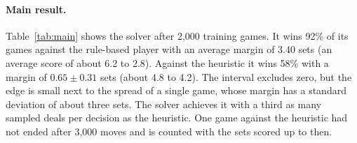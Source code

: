 \documentclass{article}
\begin{document}
\paragraph{Main result.}
Table~\ref{tab:main} shows the solver after 2,000 training games.  It wins 92\%
of its games against the rule-based player with an average margin of 3.40 sets
(an average score of about 6.2 to 2.8).  Against the heuristic it wins 58\%
with a margin of $0.65 \pm 0.31$ sets (about 4.8 to 4.2).  The interval
excludes zero, but the edge is small next to the spread of a single game, whose
margin has a standard deviation of about three sets.  The solver achieves it
with a third as many sampled deals per decision as the heuristic.  One game
against the heuristic had not ended after 3,000 moves and is counted with the
sets scored up to then.
\end{document}

